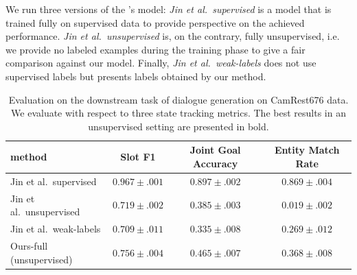 We run three versions of the \citet{jin2018explicit}'s model: \emph{Jin et al.\ supervised} is a model that is trained fully on supervised data to provide perspective on the achieved performance.
\emph{Jin et al.\ unsupervised} is, on the contrary, fully unsupervised, i.e. we provide no labeled examples during the training phase to give a fair comparison against our model.
Finally, \emph{Jin et al.\ weak-labels} does not use supervised labels but presents labels obtained by our method.

\begin{table}[tp]
    \centering
    \smaller
    \begin{tabular}{l|c|c|c}
    \hline
      \textbf{method} & \textbf{Slot F1} & \textbf{Joint Goal Accuracy} & \textbf{Entity Match Rate} \\
      \hline
        Jin et al.\ supervised & $0.967 \pm .001$ & $0.897 \pm .002$ & $0.869 \pm .004$ \\
        Jin et al.\ unsupervised & $0.719 \pm .002$ & $0.385 \pm .003$ & $0.019 \pm .002$ \\
        Jin et al.\ weak-labels & $0.709 \pm .011$ & $0.335 \pm .008$ & $0.269 \pm .012$ \\\hdashline[0.5pt/2pt]
        Ours-full (unsupervised) & $\pmb{0.756} \pm .004$ & $\pmb{0.465} \pm .007$ & $\pmb{0.368} \pm .008$ \\
     \hline
    \end{tabular}
    \caption{Evaluation on the downstream task of dialogue generation on CamRest676 data. We evaluate with respect to three state tracking metrics. The best results in an unsupervised setting are presented in bold.}
    \label{table:downstream}
\end{table}

